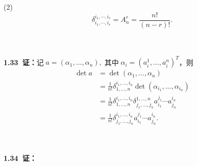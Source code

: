 (2)$$\delta_{i_1,\cdots,i_r}^{i_1,\cdots,i_r}=A_n^r=\frac{n!}{(n-r)!}.$$

\noindent
\\
\\
{\textbf{1.33\ 证：}}记$\;a=(\alpha_1,...,\alpha_n),\;$其中$\;\alpha_i=(a_i^1,...,a_i^n)^T$，则
\begin{align*}
\det a&=\det(\alpha_1,...,\alpha_n)
      \\
      &=\frac{1}{n!}\delta^{i_1,...,i_n}_{1,...,n} \det(\alpha_{i_1},...,\alpha_{i_n})
      \\
      &=\frac{1}{n!} \delta^{i_1,...,i_n}_{1,...,n} \delta_{j_1,...,j_n}^{1,...,n} a_{i_1}^{j_1}\cdots a_{j_n}^{i_n}
      \\
      &=\frac{1}{n!}\delta_{j_1,...,j_n}^{i_1,...,i_n}a_{i_1}^{j_1}\cdots a_{j_n}^{i_n}.
\end{align*}


\noindent
\\
\\
{\textbf{1.34\ 证：}}